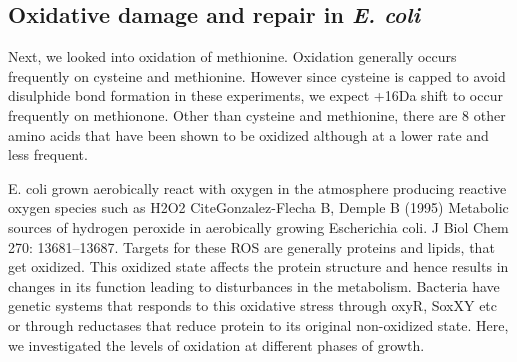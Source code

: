 \documentclass[12pt]{article}
\begin{document}
\subsection{Oxidative damage and repair in \emph{E. coli}}
%
%   
%   
%   
%
Next, we looked into oxidation of methionine. Oxidation generally occurs frequently on cysteine and methionine. However since cysteine is capped to avoid disulphide bond formation in these experiments, we expect +16Da shift to occur frequently on methionone. Other than cysteine and methionine, there are 8 other amino acids that have been shown to be oxidized although at a lower rate and less frequent. 

E. coli grown aerobically react with oxygen in the atmosphere producing reactive oxygen species such as H2O2 {CiteGonzalez-Flecha B, Demple B (1995) Metabolic sources of hydrogen peroxide in aerobically growing Escherichia coli. J Biol Chem 270: 13681–13687}. Targets for these ROS are generally proteins and lipids, that get oxidized. This oxidized state affects the protein structure and hence results in changes in its function leading to disturbances in the metabolism. Bacteria have genetic systems that responds to this oxidative stress through oxyR, SoxXY etc or through reductases that reduce protein to its original non-oxidized state. Here, we investigated the levels of oxidation at different phases of growth.
\end{document}
